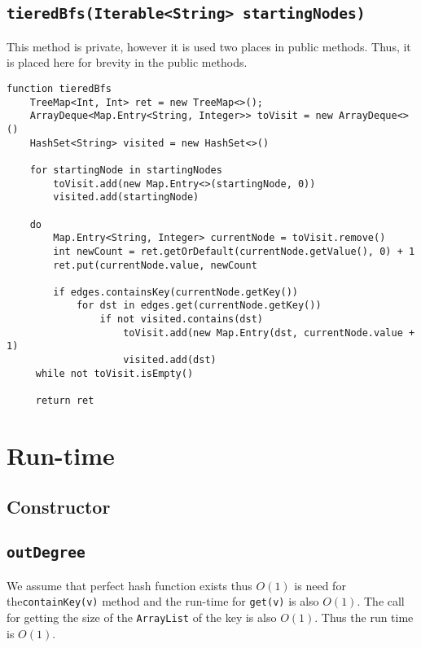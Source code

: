 \documentclass[10pt,letterpaper]{article}
\begin{document}
\subsection{\texttt{tieredBfs(Iterable<String> startingNodes)}}
This method is private, however it is used two places in public methods. Thus,
it is placed here for brevity in the public methods. 
\begin{verbatim}
function tieredBfs
    TreeMap<Int, Int> ret = new TreeMap<>();
    ArrayDeque<Map.Entry<String, Integer>> toVisit = new ArrayDeque<>()
    HashSet<String> visited = new HashSet<>()
	
    for startingNode in startingNodes
        toVisit.add(new Map.Entry<>(startingNode, 0))
        visited.add(startingNode)
	
    do
        Map.Entry<String, Integer> currentNode = toVisit.remove()
        int newCount = ret.getOrDefault(currentNode.getValue(), 0) + 1        
        ret.put(currentNode.value, newCount
        
        if edges.containsKey(currentNode.getKey())
            for dst in edges.get(currentNode.getKey())
                if not visited.contains(dst)
                    toVisit.add(new Map.Entry(dst, currentNode.value + 1)
                    visited.add(dst)
     while not toVisit.isEmpty()
     
     return ret
\end{verbatim}
\section{Run-time}
\subsection{Constructor}
\subsection{\texttt{outDegree}}
We assume that perfect hash function exists thus $O(1)$ is need for the\texttt{containKey(v)} method and the run-time for \texttt{get(v)} is also $O(1)$. The call for getting the size of the \texttt{ArrayList} of the key is also $O(1)$.
Thus the run time is $O(1)$.
\end{document}
